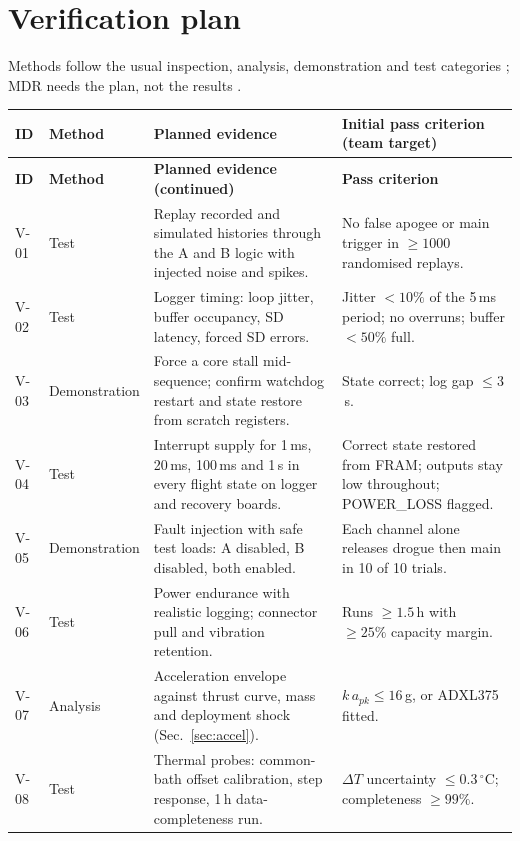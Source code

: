 \section{Verification plan}
Methods follow the usual inspection, analysis, demonstration and test categories \cite{nasase}; MDR needs the plan, not the results \cite{rtc2027app07}.

\small
{}
\begin{longtable}{@{}L{11mm}L{23mm}L{70mm}L{42mm}@{}}
\toprule{}\textbf{ID}&\textbf{Method}&\textbf{Planned evidence}&\textbf{Initial pass criterion (team target)}\\\midrule\endfirsthead
\toprule{}\textbf{ID}&\textbf{Method}&\textbf{Planned evidence (continued)}&\textbf{Pass criterion}\\\midrule\endhead
\bottomrule\endlastfoot
V-01 & Test & Replay recorded and simulated histories through the A and B logic with injected noise and spikes. & No false apogee or main trigger in $\ge1000$ randomised replays.\\
V-02 & Test & Logger timing: loop jitter, buffer occupancy, SD latency, forced SD errors. & Jitter $<10\%$ of the 5\,ms period; no overruns; buffer $<50\%$ full.\\
V-03 & Demonstration & Force a core stall mid-sequence; confirm watchdog restart and state restore from scratch registers. & State correct; log gap $\le3$\,s.\\
V-04 & Test & Interrupt supply for 1\,ms, 20\,ms, 100\,ms and 1\,s in every flight state on logger and recovery boards. & Correct state restored from FRAM; outputs stay low throughout; POWER\_LOSS flagged.\\
V-05 & Demonstration & Fault injection with safe test loads: A disabled, B disabled, both enabled. & Each channel alone releases drogue then main in 10 of 10 trials.\\
V-06 & Test & Power endurance with realistic logging; connector pull and vibration retention. & Runs $\ge1.5$\,h with $\ge25\%$ capacity margin.\\
V-07 & Analysis & Acceleration envelope against thrust curve, mass and deployment shock (Sec.~\ref{sec:accel}). & $k\,a_{pk}\le16$\,g, or ADXL375 fitted.\\
V-08 & Test & Thermal probes: common-bath offset calibration, step response, 1\,h data-completeness run. & $\Delta T$ uncertainty $\le0.3\,^{\circ}$C; completeness $\ge99\%$.\\

\end{longtable}

